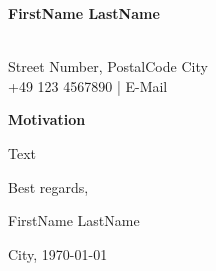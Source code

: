\begin{minipage}{.3\textwidth}
	\begin{flushleft}
		\color{lightblue}\small\textbf{FirstName LastName}\\
		~
	\end{flushleft}
\end{minipage}
\hfill
\begin{minipage}{.7\textwidth}
	\begin{flushright}
		\small\color{lightblue}Street Number, PostalCode City\\
		+49 123 4567890 | E-Mail
	\end{flushright}
\end{minipage}

{\large\textbf{Motivation}}

Text

Best regards,\\

\vspace{-5px}

\begin{minipage}{.5\textwidth}
	\begin{flushleft}
		FirstName LastName\\
	\end{flushleft}
\end{minipage}
\hfill
\begin{minipage}{.5\textwidth}
	\begin{flushright}
		City, \today
	\end{flushright}
\end{minipage}